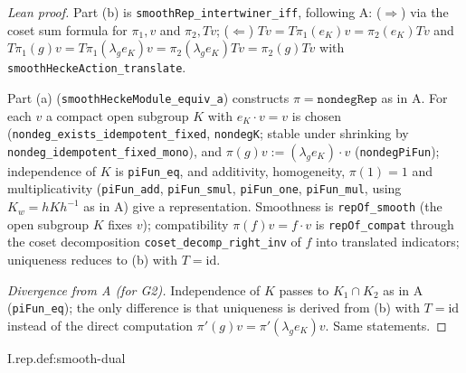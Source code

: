 \begin{proof}[Lean proof]
Part (b) is \texttt{smoothRep\_intertwiner\_iff}, following A: ($\Rightarrow$) via the coset sum formula for $\pi_1,v$ and $\pi_2,Tv$; ($\Leftarrow$) $Tv=T\pi_1(e_K)v=\pi_2(e_K)Tv$ and $T\pi_1(g)v=T\pi_1(\lambda_ge_K)v=\pi_2(\lambda_ge_K)Tv=\pi_2(g)Tv$ with \texttt{smoothHeckeAction\_translate}.

Part (a) (\texttt{smoothHeckeModule\_equiv\_a}) constructs $\pi=\texttt{nondegRep}$ as in A. For each $v$ a compact open subgroup $K$ with $e_K\cdot v=v$ is chosen (\texttt{nondeg\_exists\_idempotent\_fixed}, \texttt{nondegK}; stable under shrinking by \texttt{nondeg\_idempotent\_fixed\_mono}), and $\pi(g)v:=(\lambda_ge_K)\cdot v$ (\texttt{nondegPiFun}); independence of $K$ is \texttt{piFun\_eq}, and additivity, homogeneity, $\pi(1)=1$ and multiplicativity (\texttt{piFun\_add}, \texttt{piFun\_smul}, \texttt{piFun\_one}, \texttt{piFun\_mul}, using $K_w=hKh^{-1}$ as in A) give a representation. Smoothness is \texttt{repOf\_smooth} (the open subgroup $K$ fixes $v$); compatibility $\pi(f)v=f\cdot v$ is \texttt{repOf\_compat} through the coset decomposition \texttt{coset\_decomp\_right\_inv} of $f$ into translated indicators; uniqueness reduces to (b) with $T=\mathrm{id}$.

\emph{Divergence from A (for G2).} Independence of $K$ passes to $K_1\cap K_2$ as in A (\texttt{piFun\_eq}); the only difference is that uniqueness is derived from (b) with $T=\mathrm{id}$ instead of the direct computation $\pi'(g)v=\pi'(\lambda_ge_K)v$. Same statements.
\end{proof}

\begin{definition}
\bonly
{}
\end{definition}
\begin{tfformal}{I.rep.def:smooth-dual}
\end{tfformal}


